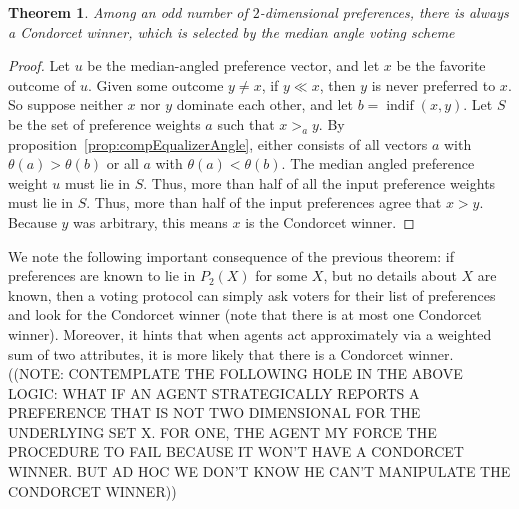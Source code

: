 \documentclass[12pt]{article}
\newtheorem{theorem}{Theorem}
\DeclareMathOperator*{\indif}{indif}
\newcommand{\1}[1]{\mathds{1}[{#1}]}
\begin{document}
  \begin{theorem}\label{thrm:2DCondorcet}
    Among an odd number of $2$-dimensional preferences,
    there is always a Condorcet winner, which is selected
    by the median angle voting scheme
  \end{theorem}
  \begin{proof}
    Let $u$ be the median-angled preference vector, and let
    $x$ be the favorite outcome of $u$.
    Given some outcome $y\ne x$, if $y \ll x$, then
    $y$ is never preferred to $x$.
    So suppose neither $x$ nor $y$ dominate each other, and let
    $b = \indif(x,y)$.
    Let $S$ be the set of preference weights $a$ such that $x>_a y$.
    By proposition~\ref{prop:compEqualizerAngle}, either consists of all vectors
    $a$ with $\theta(a) > \theta(b)$ or all $a$ with $\theta(a) < \theta(b)$.
    The median angled preference weight $u$ must lie in $S$.
    Thus, more than half of all the input preference weights must lie in $S$.
    Thus, more than half of the input preferences agree that $x > y$.
    Because $y$ was arbitrary, this means $x$ is the Condorcet winner.
  \end{proof}

  We note the following important consequence of the previous theorem:
  if preferences are known to lie in $P_2(X)$ for some $X$,
  but no details about $X$ are known, then a voting protocol can simply
  ask voters for their list of preferences and look for the Condorcet
  winner (note that there is at most one Condorcet winner).
  Moreover, it hints that when agents act approximately via a weighted
  sum of two attributes, it is more likely that there is a Condorcet winner.
  ((NOTE: CONTEMPLATE THE FOLLOWING HOLE IN THE ABOVE LOGIC:
  WHAT IF AN AGENT STRATEGICALLY REPORTS A PREFERENCE THAT IS NOT TWO
  DIMENSIONAL FOR THE UNDERLYING SET X. FOR ONE, THE AGENT MY FORCE THE
  PROCEDURE TO FAIL BECAUSE IT WON'T HAVE A CONDORCET WINNER. BUT AD HOC 
  WE DON'T KNOW HE CAN'T MANIPULATE THE CONDORCET WINNER))

  {}
  
\end{document}
